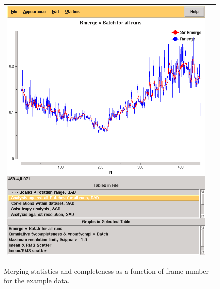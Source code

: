 \documentclass[a4paper, 11pt]{article}
\newif\ifpdf
\begin{document}
\begin{figure}
\caption{Merging statistics and completeness as a function of frame
  number for the example data.\label{figure-rmerge-completeness}}
\begin{tabular}{cc}
\ifpdf
  \includegraphics[scale=0.25]{figures/3qrn-all-rmerge-aimless.png} & 

\end{tabular}
\end{figure}
\end{document}
